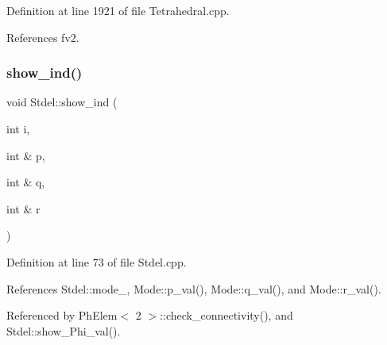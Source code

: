 Definition at line 1921 of file Tetrahedral.\+cpp.



References fv2.

\mbox{\label{classStdel_a20afd536025caf1aad1c4e3f41fcb866}} 
\subsubsection{\texorpdfstring{show\+\_\+ind()}{show\_ind()}}
{\footnotesize\ttfamily void Stdel\+::show\+\_\+ind (\begin{DoxyParamCaption}\item[{int}]{i,  }\item[{int \&}]{p,  }\item[{int \&}]{q,  }\item[{int \&}]{r }\end{DoxyParamCaption})\hspace{0.3cm}{\ttfamily [inherited]}}



Definition at line 73 of file Stdel.\+cpp.



References Stdel\+::mode\+\_\+, Mode\+::p\+\_\+val(), Mode\+::q\+\_\+val(), and Mode\+::r\+\_\+val().



Referenced by Ph\+Elem$<$ 2 $>$\+::check\+\_\+connectivity(), and Stdel\+::show\+\_\+\+Phi\+\_\+val().


